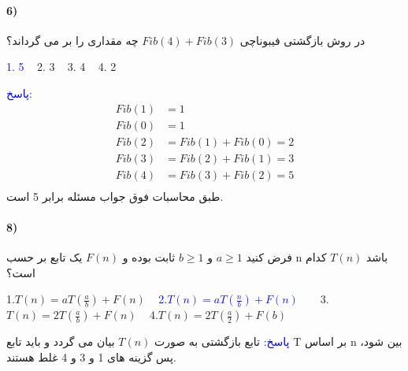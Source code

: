 \documentclass[10pt,a4paper]{article}
\begin{document}
	\paragraph{6)} در روش بازگشتی فیبوناچی $Fib(4) + Fib(3)$ چه مقداری را بر می گرداند؟
	\begin{flushright} 
		\textcolor{blue}{1.\,\,5}\,\,\,\,\, 2.\,\,3\,\,\,\,\, 3.\,\,4\,\,\,\,\, 4.\,\,2
	\end{flushright}
	\begin{flushright} 
		\textcolor{blue}{پاسخ:}
		\begin{equation*}
			\begin{split}
				Fib(1)&=1 \\
				Fib(0)&=1 \\
				Fib(2)&=Fib(1)+Fib(0)=2 \\
				Fib(3)&=Fib(2)+Fib(1)=3 \\
				Fib(4)&=Fib(3)+Fib(2)=5 \\
			\end{split} 
		\end{equation*}
	طبق محاسبات فوق جواب مسئله برابر 5 است.
	\end{flushright}

	\paragraph{8)} فرض کنید $a\ge1$ و $b\ge1$ ثابت بوده و $F(n)$ یک تابع بر حسب n باشد $T(n)$ کدام است؟
	\begin{flushright} 
		1.$T(n)=aT(\frac{a}{b})+F(n)$\,\,\,\,\, \textcolor{blue}{2.$T(n)=aT(\frac{n}{b})+F(n)$}\,\,\,\,\,\,\,\,\,\, 3.$T(n)=2T(\frac{a}{b})+F(n)$\,\,\,\,\, 4.$T(n)=2T(\frac{a}{2})+F(b)$
	\end{flushright}
	\begin{flushright} 
		\textcolor{blue}{پاسخ:}
	تابع بازگشتی به صورت $T(n)$ بیان می گردد و باید تابع T بر اساس n بین شود، پس گزینه های 1 و 3 و 4 غلط هستند.
	\end{flushright}
\end{document}
